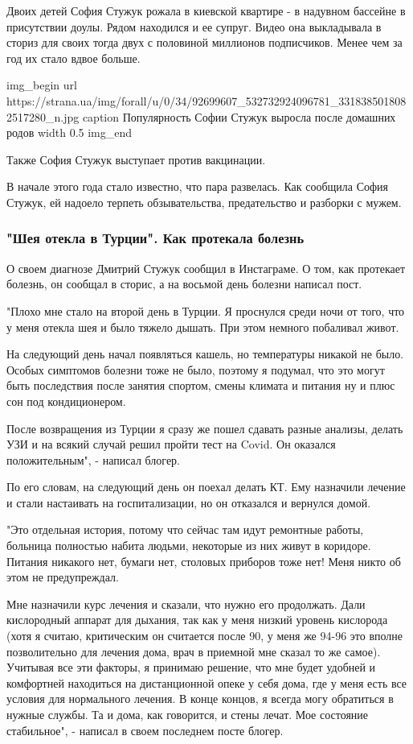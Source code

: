 Двоих детей София Стужук рожала в киевской квартире - в надувном
бассейне в присутствии доулы. Рядом находился и ее супруг. Видео она
выкладывала в сториз для своих тогда двух с половиной миллионов
подписчиков. Менее чем за год их стало вдвое больше.

\ifcmt
img_begin 
	url https://strana.ua/img/forall/u/0/34/92699607_532732924096781_3318385018082517280_n.jpg
	caption Популярность Софии Стужук выросла после домашних родов
	width 0.5
img_end
\fi

Также София Стужук выступает против вакцинации.

В начале этого года стало известно, что пара развелась. Как сообщила
София Стужук, ей надоело терпеть обзывательства, предательство и
разборки с мужем.

\subsubsection{"Шея отекла в Турции". Как протекала болезнь}

О своем диагнозе Дмитрий Стужук сообщил в Инстаграме. О том, как
протекает болезнь, он сообщал в сторис, а на восьмой день болезни
написал пост.

"Плохо мне стало на второй день в Турции. Я проснулся среди ночи от
того, что у меня отекла шея и было тяжело дышать. При этом немного
побаливал живот.  ⠀

На следующий день начал появляться кашель, но температуры никакой не было.
Особых симптомов болезни тоже не было, поэтому я подумал, что это могут быть
последствия после занятия спортом, смены климата и питания ну и плюс сон под
кондиционером.

После возвращения из Турции я сразу же пошел сдавать разные анализы, делать УЗИ
и на всякий случай решил пройти тест на Covid. Он оказался положительным", -
написал блогер.

По его словам, на следующий день он поехал делать КТ. Ему назначили лечение и
стали настаивать на госпитализации, но он отказался и вернулся домой.

"Это отдельная история, потому что сейчас там идут ремонтные работы,
больница полностью набита людьми, некоторые из них живут в коридоре.
Питания никакого нет, бумаги нет, столовых приборов тоже нет! Меня
никто об этом не предупреждал. 

Мне назначили курс лечения и сказали, что нужно его продолжать. Дали
кислородный аппарат для дыхания, так как у меня низкий уровень
кислорода (хотя я считаю, критическим он считается после 90, у меня
же 94-96 это вполне позволительно для лечения дома, врач в приемной
мне сказал то же самое).  ⠀ Учитывая все эти факторы, я принимаю
решение, что мне будет удобней и комфортней находиться на
дистанционной опеке у себя дома, где у меня есть все условия для
нормального лечения. В конце концов, я всегда могу обратиться в
нужные службы. Та и дома, как говорится, и стены лечат. Мое состояние
стабильное", - написал в своем последнем посте блогер.

